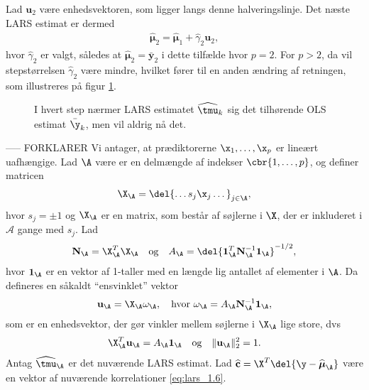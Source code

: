 %
Lad $\mathbf{u}_2$ være enhedsvektoren, som ligger langs denne halveringslinje.
Det næste LARS estimat er dermed
\begin{align*}
\widehat{\boldsymbol{\mu}}_2 = \widehat{\boldsymbol{\mu}}_1+ \widehat{\gamma}_2 \mathbf{u}_2,
\end{align*}
hvor $\widehat{\gamma}_2$ er valgt, således at $\widehat{\boldsymbol{\mu}}_2 = \bar{\textbf{y}}_2$ i dette tilfælde hvor $p = 2$. 
For \(p>2\), da vil stepstørrelsen \(\widehat{\gamma}_2\) være mindre, hvilket fører til en anden ændring af retningen, som illustreres på figur \ref{fig:lars2}.
%
\begin{figure}[H]
\centering
\scalebox{0.8}{}
\caption{I hvert step nærmer LARS estimatet \(\widehat{\tmu}_k\) sig det tilhørende OLS estimat \(\bar{\y}_k\), men vil aldrig nå det.
 }\label{fig:lars2}
\end{figure}
%
----- FORKLARER
Vi antager, at prædiktorerne \(\x_1, \ldots, \x_p\) er lineært uafhængige.
Lad \(\A\) være er en delmængde af indekser \(\cbr{1,\ldots, p}\), og definer matricen
\begin{align}
\X_\A = \del{\dots s_j \x_j \dots}_{j \in \A}, \label{eq:lars_2.4}
\end{align}
hvor $s_j = \pm 1$ og \(\X_\A\) er en matrix, som består af søjlerne i \(\X\), der er inkluderet i \(\mathcal{A}\) gange med \(s_j\).
Lad 
\begin{align}
\mathbf{N}_\A = \X_\A^T \X_\A \quad \text{og} \quad A_\A = \del{\mathbf{1}_\A^T \mathbf{N}_\A^{-1} \mathbf{1}_\A}^{-1/2}, \label{eq:lars_2.5}
\end{align}
hvor \(\mathbf{1}_\A\) er en vektor af 1-taller med en længde lig antallet af elementer i \(\A\).
Da defineres en såkaldt ``ensvinklet'' vektor
\begin{align}
\mathbf{u}_\A = \X_\A \omega_\A, \quad \text{hvor } \omega_\A = A_\A \mathbf{N}_\A^{-1} \mathbf{1}_\A, \label{eq:lars_2.6}
\end{align}
som er en enhedsvektor, der gør vinkler mellem søjlerne i \(\X_\A\) lige store, dvs
\begin{align}
\X_\A^T \mathbf{u}_\A = A_\A \mathbf{1}_\A \quad \text{og} \quad \Vert \mathbf{u}_\A \Vert_2^2 = 1. \label{eq:lars_2.7}
\end{align}
Antag \(\widehat{\tmu}_\A\) er det nuværende LARS estimat.
Lad \(\widehat{\mathbf{c}} = \X^T \del{\y - \widehat{\boldsymbol{\mu}}_\A}\) være en vektor af nuværende korrelationer \eqref{eq:lars_1.6}.
